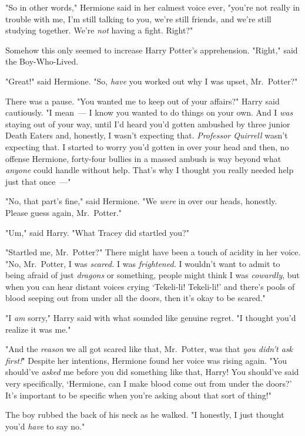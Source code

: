 "So in other words," Hermione said in her calmest voice ever, "you're not
really in trouble with me, I'm still talking to you, we're still friends, and
we're still studying together. We're \emph{not} having a fight. Right?"

Somehow this only seemed to increase Harry Potter's apprehension. "Right," said
the Boy-Who-Lived.

"Great!" said Hermione. "So, \emph{have} you worked out why I was upset,
Mr.~Potter?"

There was a pause. "You wanted me to keep out of your affairs?" Harry said
cautiously. "I mean~--- I know you wanted to do things on your own. And I
\emph{was} staying out of your way, until I'd heard you'd gotten ambushed by
three junior Death Eaters and, honestly, I wasn't expecting that.
\emph{Professor Quirrell} wasn't expecting that. I started to worry you'd
gotten in over your head and then, no offense Hermione, forty-four bullies in a
massed ambush is way beyond what \emph{anyone} could handle without help.
That's why I thought you really needed help just that once~---"

"No, that part's fine," said Hermione. "We \emph{were} in over our heads,
honestly. Please guess again, Mr.~Potter."

"Um," said Harry. "What Tracey did{\el} startled you?"

"Startled me, Mr.~Potter?" There might have been a touch of acidity in her
voice. "No, Mr.~Potter, I was \emph{scared.} I was \emph{frightened.} I
wouldn't want to admit to being afraid of just \emph{dragons} or something,
people might think I was \emph{cowardly}, but when you can hear distant voices
crying `Tekeli-li! Tekeli-li!' and there's pools of blood seeping out from
under all the doors, then it's okay to be scared."

"I \emph{am} sorry," Harry said with what sounded like genuine regret. "I
thought you'd realize it was me."

"And the \emph{reason} we all got scared like that, Mr.~Potter, was that
\emph{you didn't ask first!}" Despite her intentions, Hermione found her voice
was rising again. "You should've \emph{asked} me before you did something like
that, Harry! You should've said very specifically, `Hermione, can I make blood
come out from under the doors?' It's important to be specific when you're
asking about that sort of thing!"

The boy rubbed the back of his neck as he walked. "I{\el} honestly, I just
thought you'd \emph{have} to say no."

